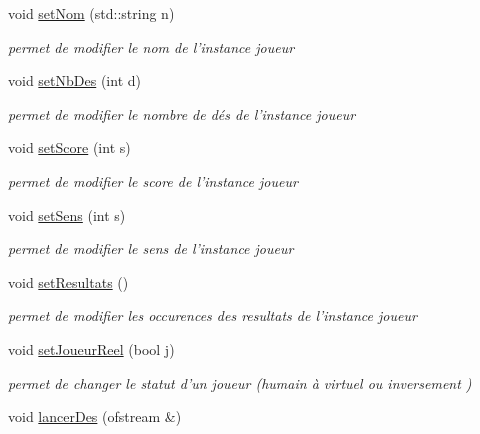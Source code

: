 \begin{DoxyCompactItemize}
void \hyperlink{class_joueur_afa24ba80453522ff059e7e6f46653749}{set\-Nom} (std\-::string n)
\begin{DoxyCompactList}\small\item\em permet de modifier le nom de l'instance joueur \end{DoxyCompactList}\item 
void \hyperlink{class_joueur_acdc63344abd624b4053c3a604df0789f}{set\-Nb\-Des} (int d)
\begin{DoxyCompactList}\small\item\em permet de modifier le nombre de dés de l'instance joueur \end{DoxyCompactList}\item 
void \hyperlink{class_joueur_a64402c4935da5cc0dda22c1e4d5bd6c4}{set\-Score} (int s)
\begin{DoxyCompactList}\small\item\em permet de modifier le score de l'instance joueur \end{DoxyCompactList}\item 
void \hyperlink{class_joueur_a6a70e7d5fd8fdd206dcfda1a570b9dd1}{set\-Sens} (int s)
\begin{DoxyCompactList}\small\item\em permet de modifier le sens de l'instance joueur \end{DoxyCompactList}\item 
\hypertarget{class_joueur_a0c75c574af8cf918215f290014b0a6bd}{void \hyperlink{class_joueur_a0c75c574af8cf918215f290014b0a6bd}{set\-Resultats} ()}\label{class_joueur_a0c75c574af8cf918215f290014b0a6bd}

\begin{DoxyCompactList}\small\item\em permet de modifier les occurences des resultats de l'instance joueur \end{DoxyCompactList}\item 
void \hyperlink{class_joueur_a2a77491ddd4c4287ab64f7e9ab1cabfc}{set\-Joueur\-Reel} (bool j)
\begin{DoxyCompactList}\small\item\em permet de changer le statut d'un joueur (humain à virtuel ou inversement ) \end{DoxyCompactList}\item 
\hypertarget{class_joueur_a5f87ec6d9431d998c82bcf31d9a3b92a}{void \hyperlink{class_joueur_a5f87ec6d9431d998c82bcf31d9a3b92a}{lancer\-Des} (ofstream \&)}\label{class_joueur_a5f87ec6d9431d998c82bcf31d9a3b92a}


\end{DoxyCompactItemize}
